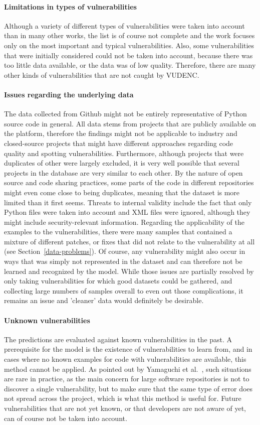\documentclass[
a4paper,
pagesize,
pdftex,
12pt,
ngerman,
fleqn,
final,
]{scrartcl}
\begin{document}
	\paragraph{Limitations in types of vulnerabilities}
	Although a variety of different types of vulnerabilities were taken into account than in many other works, the list is of course not complete and the work focuses only on the most important and typical vulnerabilities. Also, some vulnerabilities that were initially considered could not be taken into account, because there was too little data available, or the data was of low quality. Therefore, there are many other kinds of vulnerabilities that are not caught by VUDENC. 
	\paragraph{Issues regarding the underlying data}
	The data collected from Github might not be entirely representative of Python source code in general. All data stems from projects that are publicly available on the platform, therefore the findings might not be applicable to industry and closed-source projects that might have different approaches regarding code quality and spotting vulnerabilities. Furthermore, although projects that were duplicates of other were largely excluded, it is very well possible that several projects in the database are very similar to each other. By the nature of open source and code sharing practices, some parts of the code in different repositories might even come close to being duplicates, meaning that the dataset is more limited than it first seems. Threats to internal validity include the fact that only Python files were taken into account and XML files were ignored, although they might include security-relevant information. Regarding the applicability of the examples to the vulnerabilities, there were many samples that contained a mixture of different patches, or fixes that did not relate to the vulnerability at all (see Section~\ref{data-problems}). Of course, any vulnerability might also occur in ways that was simply not represented in the dataset and can therefore not be learned and recognized by the model. While those issues are partially resolved by only taking vulnerabilities for which good datasets could be gathered, and collecting large numbers of samples overall to even out those complications, it remains an issue and 'cleaner' data would definitely be desirable.
	\paragraph{Unknown vulnerabilities}
	The predictions are evaluated against known vulnerabilities in the past. A prerequisite for the model is the existence of vulnerabilities to learn from, and in cases where no known examples for code with vulnerabilities are available, this method cannot be applied. As pointed out by Yamaguchi et al.~\cite{Yamaguchi.2012}, such situations are rare in practice, as the main concern for large software repositories is not to discover a single vulnerability, but to make sure that the same type of error does not spread across the project, which is what this method is useful for. Future vulnerabilities that are not yet known, or that developers are not aware of yet, can of course not be taken into account.
\end{document}
